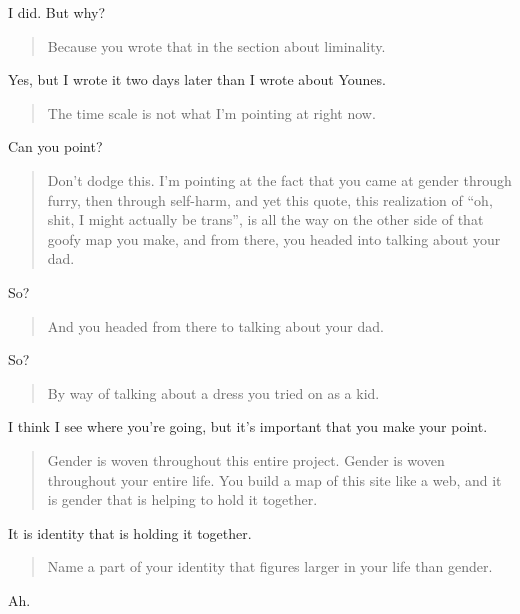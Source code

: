 I did. But why?

\begin{quote}
Because you wrote that in the section about liminality.
\end{quote}

Yes, but I wrote it two days later than I wrote about Younes.

\begin{quote}
The time scale is not what I'm pointing at right now.
\end{quote}

Can you point?

\begin{quote}
Don't dodge this. I'm pointing at the fact that you came at gender through furry, then through self-harm, and yet this quote, this realization of ``oh, shit, I might actually be trans'', is all the way on the other side of that goofy map you make, and from there, you headed into talking about your dad.
\end{quote}

So?

\begin{quote}
And you headed from there to talking about your dad.
\end{quote}

So?

\begin{quote}
By way of talking about a dress you tried on as a kid.
\end{quote}

I think I see where you're going, but it's important that you make your point.

\begin{quote}
Gender is woven throughout this entire project. Gender is woven throughout your entire life. You build a map of this site like a web, and it is gender that is helping to hold it together.
\end{quote}

It is identity that is holding it together.

\begin{quote}
Name a part of your identity that figures larger in your life than gender.
\end{quote}

Ah.

